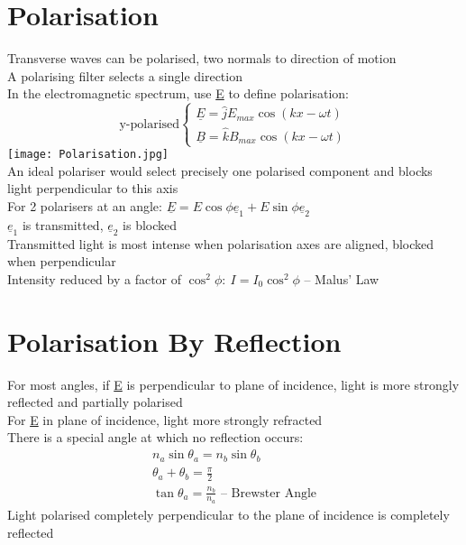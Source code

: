 \documentclass[a4paper, 11pt, fleqn, normalem]{report}
\begin{document}
\section{Polarisation}
Transverse waves can be polarised, two normals to direction of motion \\
A polarising filter selects a single direction \\
In the electromagnetic spectrum, use \underline{E} to define polarisation:
\begin{equation*}
    \text{y-polarised}
    \begin{cases}
        \underline{E} = \hat{j}E_{max}\cos{(kx - \omega t)} \\
        \underline{B} = \hat{k}B_{max}\cos{(kx - \omega t)}
    \end{cases}
\end{equation*}
\texttt{[image: Polarisation.jpg]} \\
An ideal polariser would select precisely one polarised component and blocks light perpendicular to this axis \\
For 2 polarisers at an angle: $\underline{E} = E\cos{\phi}\underline{e}_{1} + E\sin{\phi}\underline{e}_{2}$ \\
$\underline{e}_{1}$ is transmitted, $\underline{e}_{2}$ is blocked \\
Transmitted light is most intense when polarisation axes are aligned, blocked when perpendicular \\
Intensity reduced by a factor of $\cos^{2}{\phi}:~I = I_{0}\cos^{2}{\phi}$ -- Malus' Law

\section{Polarisation By Reflection}
For most angles, if \underline{E} is perpendicular to plane of incidence, light is more strongly reflected and partially polarised \\
For \underline{E} in plane of incidence, light more strongly refracted \\
There is a special angle at which no reflection occurs:
\begin{gather*}
    n_{a}\sin{\theta_{a}} = n_{b}\sin{\theta_{b}} \\
    \theta_{a} + \theta_{b} = \frac{\pi}{2} \\
    \tan{\theta_{a}} = \frac{n_{b}}{n_{a}}\text{ -- Brewster Angle}
\end{gather*}
Light polarised completely perpendicular to the plane of incidence is completely reflected
\end{document}
